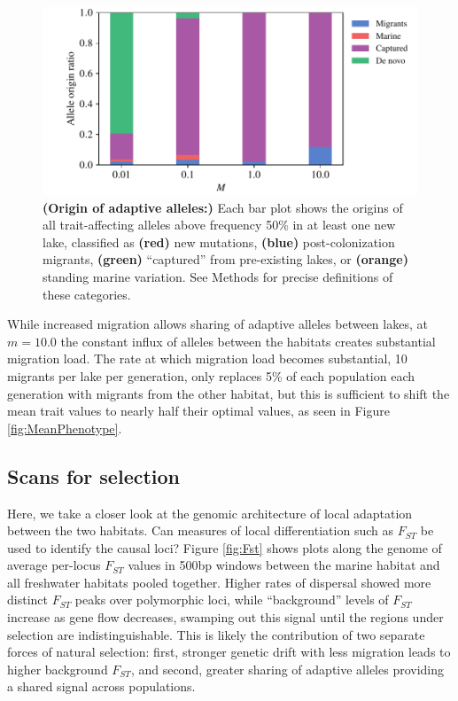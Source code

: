 \documentclass{article}
\begin{document}
\begin{figure}
    \begin{center}
    \includegraphics{Final_Plots/Allele_Origin_2.pdf}
    \caption{ 
        \textbf{(Origin of adaptive alleles:)}
        Each bar plot shows the origins
        of all trait-affecting alleles above frequency 50\% in at least one new lake,
        classified as
        \textbf{(red)} new mutations,
        \textbf{(blue)} post-colonization migrants,
        \textbf{(green)} ``captured'' from pre-existing lakes, or
        \textbf{(orange)} standing marine variation.
        See Methods for precise definitions of these categories.
    } \label{fig:Origin}
    \end{center}
\end{figure}

While increased migration allows sharing of adaptive alleles between lakes, at $m = 10.0$ the constant influx of alleles between the habitats creates substantial migration load. The rate at which migration load becomes substantial, 10 migrants per lake per generation, only replaces 5\% of each population each generation with migrants from the other habitat, but this is sufficient to shift the mean trait values to nearly half their optimal values, as seen in Figure \ref{fig:MeanPhenotype}. 

\subsection*{Scans for selection}

Here, we take a closer look at the genomic architecture of local adaptation between the two habitats. Can measures of local differentiation such as $F_{ST}$ be used to identify the causal loci? Figure \ref{fig:Fst} shows plots along the genome of average per-locus $F_{ST}$ values in 500bp windows between the marine habitat and all freshwater habitats pooled together. Higher rates of dispersal showed more distinct $F_{ST}$ peaks over polymorphic loci, while ``background'' levels of $F_{ST}$ increase as gene flow decreases, swamping out this signal until the regions under selection are indistinguishable. This is likely the contribution of two separate forces of natural selection: first, stronger genetic drift with less migration leads to higher background $F_{ST}$, and second, greater sharing of adaptive alleles providing a shared signal across populations.
\end{document}
